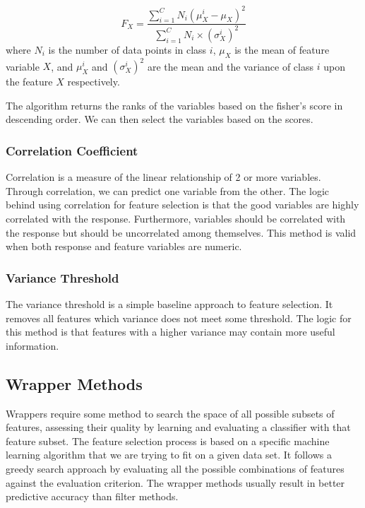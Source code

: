 \documentclass[
]{article}
\begin{document}
\[
F_X = \frac{\sum_{i=1}^C N_i(\mu_{X}^i-\mu_{X})^2}{\sum_{i=1}^CN_i\times (\sigma_X^i)^2}
\] where \(N_i\) is the number of data points in class \(i\), \(\mu_X\)
is the mean of feature variable \(X\), and \(\mu_X^i\) and
\((\sigma_X^i)^2\) are the mean and the variance of class \(i\) upon the
feature \(X\) respectively.

The algorithm returns the ranks of the variables based on the fisher's
score in descending order. We can then select the variables based on the
scores.

\hypertarget{correlation-coefficient}{%
\subsubsection{Correlation Coefficient}\label{correlation-coefficient}}

Correlation is a measure of the linear relationship of 2 or more
variables. Through correlation, we can predict one variable from the
other. The logic behind using correlation for feature selection is that
the good variables are highly correlated with the response. Furthermore,
variables should be correlated with the response but should be
uncorrelated among themselves. This method is valid when both response
and feature variables are numeric.

\hypertarget{variance-threshold}{%
\subsubsection{Variance Threshold}\label{variance-threshold}}

The variance threshold is a simple baseline approach to feature
selection. It removes all features which variance does not meet some
threshold. The logic for this method is that features with a higher
variance may contain more useful information.

\hypertarget{wrapper-methods}{%
\subsection{Wrapper Methods}\label{wrapper-methods}}

Wrappers require some method to search the space of all possible subsets
of features, assessing their quality by learning and evaluating a
classifier with that feature subset. The feature selection process is
based on a specific machine learning algorithm that we are trying to fit
on a given data set. It follows a greedy search approach by evaluating
all the possible combinations of features against the evaluation
criterion. The wrapper methods usually result in better predictive
accuracy than filter methods.
\end{document}
